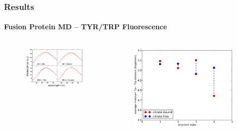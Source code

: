 \documentclass[english]{beamer}
\begin{document}
\begin{frame}
    \frametitle{Results}
    \framesubtitle{Fusion Protein MD -- TYR/TRP Fluorescence}  

    \vfill

    \begin{columns}[]
        \vfill
        \begin{figure}
            \includegraphics[width=1.0\textwidth]{figures/TyrTrp/TyrTrp_experiment.pdf}
        \end{figure}         

        \vfill
        \begin{figure}
            \includegraphics[width=1.0\textwidth]{figures/TyrTrp/average_mindist_TyrTrp.pdf}
        \end{figure}      

    \end{columns}    

    \vfill
 
\end{frame}        
\end{document}
